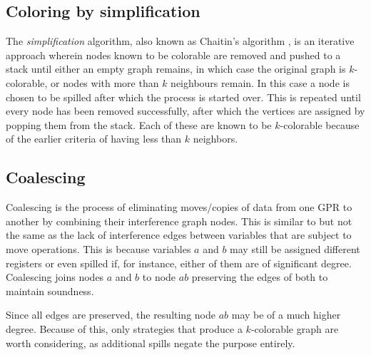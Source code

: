 \documentclass{article}
\begin{document}
\subsection{Coloring by simplification}

The \textit{simplification} algorithm, also known as Chaitin's algorithm \cite{chaitin}, 
 is an iterative approach wherein nodes known to be colorable are removed and pushed to a stack until either an empty graph remains, in which case the original graph is \(k\)-colorable,  or nodes with more than \(k\) neighbours remain.
In this case a node is chosen to be spilled after which the process is started over. This is repeated until every node has been removed successfully, after which the vertices are assigned by popping them from the stack. Each of these are known to be \(k\)-colorable because of the earlier criteria of having less than \(k\) neighbors.





\subsection{Coalescing}


Coalescing is the process of eliminating moves/copies of data from one GPR to another by combining their interference graph nodes.  This is similar to but  not the same as  the lack of interference edges between variables that are subject to move operations. This is because variables \(a\) and \(b\) may still be assigned different registers or even spilled if,  for instance, either of them are of significant degree. Coalescing joins nodes \(a\) and \(b\) to node \(ab\) preserving the edges of both to maintain soundness.

Since all edges are preserved, the resulting node \(ab\) may be of a much higher degree. Because of this, only strategies that produce a \(k\)-colorable graph are worth considering, as additional spills negate the purpose entirely.
\end{document}
